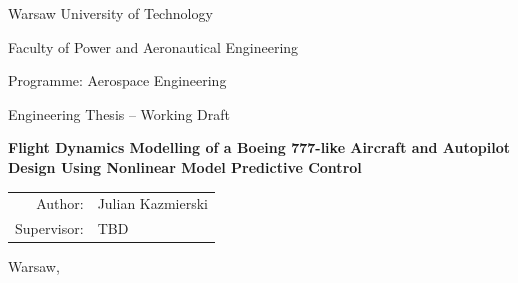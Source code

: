 \documentclass[12pt,a4paper,oneside]{report}
\newcommand{\University}{Warsaw University of Technology}
\newcommand{\Faculty}{Faculty of Power and Aeronautical Engineering}
\newcommand{\Field}{Aerospace Engineering}
\newcommand{\AuthorName}{Julian Kazmierski}
\newcommand{\SupervisorName}{TBD}
\newcommand{\ThesisTitle}{Flight Dynamics Modelling of a Boeing 777-like Aircraft and Autopilot Design Using Nonlinear Model Predictive Control}
\newcommand{\ThesisType}{Engineering Thesis -- Working Draft}
\begin{document}

\begin{titlepage}
    \centering
    {\Large \University\par}
    \vspace{0.3cm}
    {\large \Faculty\par}
    \vspace{0.3cm}
    {\large Programme: \Field\par}

    \vspace{2.5cm}
    {\large \ThesisType\par}
    \vspace{1.0cm}
    {\LARGE\bfseries \ThesisTitle\par}

    \vspace{2.5cm}
    \begin{flushright}
        \begin{tabular}{rl}
            Author: & \AuthorName \\
            Supervisor: & \SupervisorName \\
        \end{tabular}
    \end{flushright}

    \vfill
    {Warsaw, \the\year\par}
\end{titlepage}

\cleardoublepage
{}




\tableofcontents



\cleardoublepage
{}











\printbibliography[heading=bibintoc,title={References}]
\end{document}
